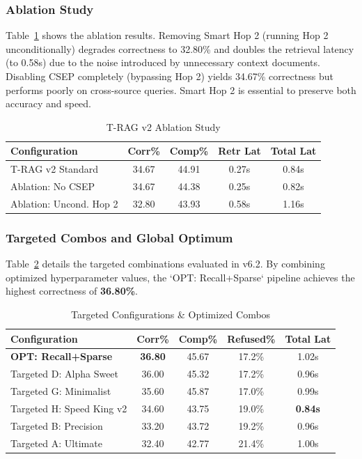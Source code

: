 \documentclass[conference]{IEEEtran}
\begin{document}
\subsubsection{Ablation Study}
Table~\ref{tab:ablations} shows the ablation results. Removing Smart Hop 2 (running Hop 2 unconditionally) degrades correctness to 32.80\% and doubles the retrieval latency (to 0.58s) due to the noise introduced by unnecessary context documents. Disabling CSEP completely (bypassing Hop 2) yields 34.67\% correctness but performs poorly on cross-source queries. Smart Hop 2 is essential to preserve both accuracy and speed.

\begin{table}[htbp]
\caption{T-RAG v2 Ablation Study}
\label{tab:ablations}
\begin{center}
\footnotesize
\setlength{\tabcolsep}{4pt}
\begin{tabular}{lcccc}
\toprule
\textbf{Configuration} & \textbf{Corr\%} & \textbf{Comp\%} & \textbf{Retr Lat} & \textbf{Total Lat} \\
\midrule
T-RAG v2 Standard & 34.67 & 44.91 & 0.27s & 0.84s \\
Ablation: No CSEP & 34.67 & 44.38 & 0.25s & 0.82s \\
Ablation: Uncond. Hop 2 & 32.80 & 43.93 & 0.58s & 1.16s \\
\bottomrule
\end{tabular}
\end{center}
\end{table}

\subsubsection{Targeted Combos and Global Optimum}
Table~\ref{tab:targeted} details the targeted combinations evaluated in v6.2. By combining optimized hyperparameter values, the `OPT: Recall+Sparse` pipeline achieves the highest correctness of \textbf{36.80\%}.

\begin{table}[htbp]
\caption{Targeted Configurations \& Optimized Combos}
\label{tab:targeted}
\begin{center}
\footnotesize
\setlength{\tabcolsep}{4pt}
\begin{tabular}{lcccc}
\toprule
\textbf{Configuration} & \textbf{Corr\%} & \textbf{Comp\%} & \textbf{Refused\%} & \textbf{Total Lat} \\
\midrule
\textbf{OPT: Recall+Sparse} & \textbf{36.80} & 45.67 & 17.2\% & 1.02s \\
Targeted D: Alpha Sweet & 36.00 & 45.32 & 17.2\% & 0.96s \\
Targeted G: Minimalist & 35.60 & 45.87 & 17.0\% & 0.99s \\
Targeted H: Speed King v2 & 34.60 & 43.75 & 19.0\% & \textbf{0.84s} \\
Targeted B: Precision & 33.20 & 43.72 & 19.2\% & 0.96s \\
Targeted A: Ultimate & 32.40 & 42.77 & 21.4\% & 1.00s \\
\bottomrule
\end{tabular}
\end{center}
\end{table}
\end{document}
